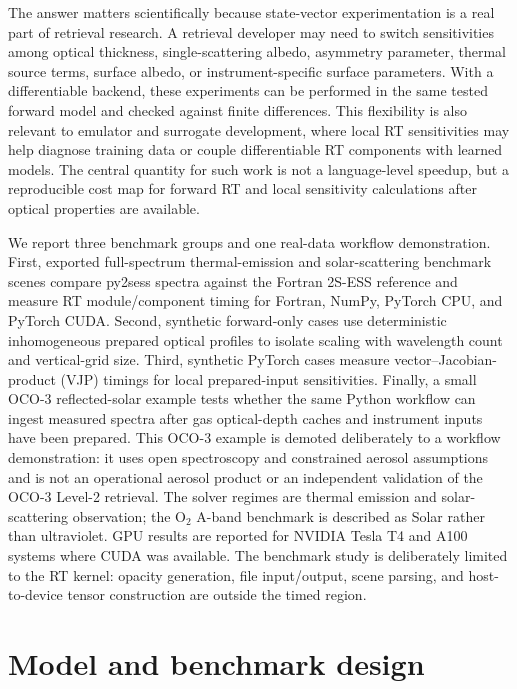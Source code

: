 \documentclass[gmd, manuscript]{copernicus}
\begin{document}
The answer matters scientifically because state-vector experimentation is a real part
of retrieval research.  A retrieval developer may need to switch sensitivities among
optical thickness, single-scattering albedo, asymmetry parameter, thermal source terms,
surface albedo, or instrument-specific surface parameters.  With a differentiable
backend, these experiments can be performed in the same tested forward model and
checked against finite differences.  This flexibility is also relevant to emulator and
surrogate development, where local RT sensitivities may help diagnose training data or
couple differentiable RT components with learned models.  The central quantity for such
work is not a language-level speedup, but a reproducible cost map for forward RT and
local sensitivity calculations after optical properties are available.

We report three benchmark groups and one real-data workflow demonstration.  First,
exported full-spectrum thermal-emission and solar-scattering benchmark scenes
compare py2sess spectra against the Fortran 2S-ESS reference and measure RT
module/component timing for Fortran, NumPy, PyTorch CPU, and PyTorch CUDA.  Second,
synthetic forward-only cases use deterministic inhomogeneous prepared optical profiles
to isolate scaling with wavelength count and vertical-grid size.  Third, synthetic
PyTorch cases measure vector--Jacobian-product (VJP) timings for local prepared-input
sensitivities.
Finally, a small OCO-3 reflected-solar example tests whether the same Python workflow
can ingest measured spectra after gas optical-depth caches and instrument inputs have
been prepared.  This OCO-3 example is demoted deliberately to a workflow
demonstration: it uses open spectroscopy and constrained aerosol assumptions and is not
an operational aerosol product or an independent validation of the OCO-3 Level-2
retrieval.  The solver regimes are thermal emission and solar-scattering observation;
the O$_2$ A-band benchmark is described as Solar rather than ultraviolet.  GPU
results are reported for NVIDIA Tesla T4 and A100 systems where CUDA was available.
The benchmark study is deliberately limited to the RT kernel: opacity generation, file
input/output, scene parsing, and host-to-device tensor construction are outside the
timed region.

\section{Model and benchmark design}
\end{document}
